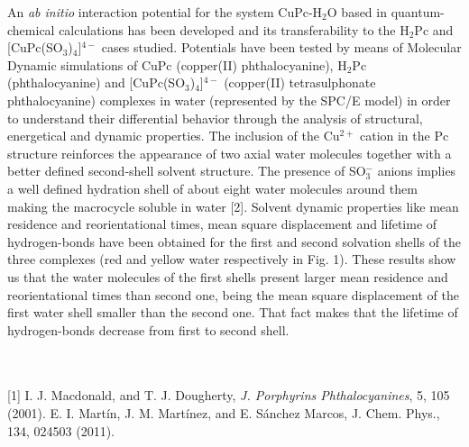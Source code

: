 An \textit{ab initio} interaction potential for the system CuPc-H$_{2}$O based in quantum-chemical calculations has been developed and its transferability to the H$_{2}$Pc and [CuPc(SO$_{3}$)$_{4}$]$^{4-}$ cases studied.  Potentials have been tested by means of Molecular Dynamic simulations of CuPc (copper(II) phthalocyanine), H$_{2}$Pc (phthalocyanine) and [CuPc(SO$_{3}$)$_{4}$]$^{4-}$ (copper(II) tetrasulphonate phthalocyanine) complexes in water (represented by the SPC/E model) in order to understand their differential behavior through the analysis of structural, energetical and dynamic properties. The inclusion of the Cu$^{2+}$ cation in the Pc structure reinforces the appearance of two axial water molecules together with a better defined second-shell solvent structure. The presence of SO$_{3}^{-}$ anions implies a well defined hydration shell of about eight water molecules around them making the macrocycle soluble in water [2].  Solvent dynamic properties like mean residence and reorientational times, mean square displacement and lifetime of hydrogen-bonds have been obtained for the first and second solvation shells of the three complexes (red and yellow water respectively in Fig. 1). These results show us that the water molecules of the first shells present larger mean residence and reorientational times than second one, being the mean square displacement of the first water shell smaller than the second one. That fact makes that the lifetime of hydrogen-bonds decrease from first to second shell.
\begin{figure}[h]
 \centerline{}
 \caption[]{ }
\end{figure}
\\
\vspace{0.5cm}
\\
{\footnotesize
[1] I. J. Macdonald, and T. J. Dougherty, \textit{J. Porphyrins Phthalocyanines}, 5, 105 (2001).
\newline
[2] E. I. Martín, J. M. Martínez, and E. Sánchez Marcos, J. Chem. Phys., 134, 024503 (2011).
\newline
}

\newpage
\setcounter{figure}{0}
